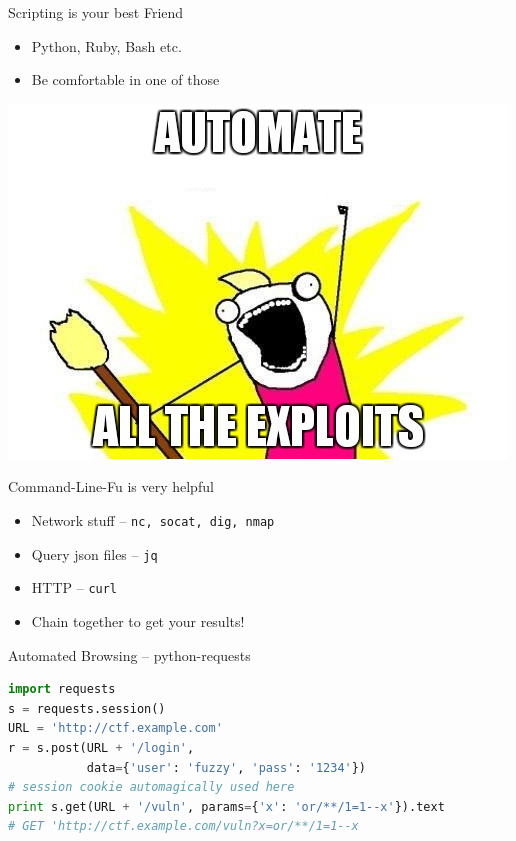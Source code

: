 \begin{frame}
  {Scripting is your best Friend}

  \begin{itemize}
    \item Python, Ruby, Bash etc.
    \item Be comfortable in one of those
  \end{itemize}

  \begin{center}
    \includegraphics[height=0.5\textheight]{images/automatealltheexploits.jpg}
  \end{center}
\end{frame}


\begin{frame}
  {Command-Line-Fu is very helpful}

  \begin{itemize}
    \item Network stuff -- \texttt{nc, socat, dig, nmap}
    \item Query json files -- \texttt{jq}
    \item HTTP -- \texttt{curl}
  \end{itemize}

  \begin{itemize}
    \item Chain together to get your results!
  \end{itemize}
\end{frame}


\begin{frame}[fragile]
  {Automated Browsing -- python-requests}

  \begin{lstlisting}[language=python]
import requests
s = requests.session()
URL = 'http://ctf.example.com'
r = s.post(URL + '/login',
           data={'user': 'fuzzy', 'pass': '1234'})
# session cookie automagically used here
print s.get(URL + '/vuln', params={'x': 'or/**/1=1--x'}).text
# GET 'http://ctf.example.com/vuln?x=or/**/1=1--x
  \end{lstlisting}
\end{frame}

